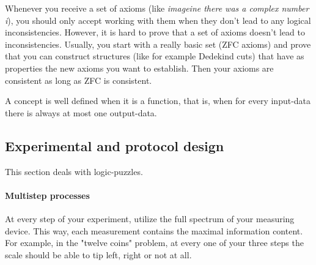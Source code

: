 Whenever you receive a set of axioms (like \emph{imageine there was a complex number i}), you should only accept working with them when they don't lead to any logical inconsistencies. However, it is hard to prove that a set of axioms doesn't lead to inconsistencies. Usually, you start with a really basic set (ZFC axioms) and prove that you can construct structures (like for example Dedekind cuts) that have as properties the new axioms you want to establish. Then your axioms are consistent as long as ZFC is consistent. 

A concept is well defined when it is a function, that is, when for every input-data there is always at most one output-data. 


\subsection{Experimental and protocol design}

This section deals with logic-puzzles. 

\paragraph{Multistep processes}
At every step of your experiment, utilize the full spectrum of your measuring device. This way, each measurement contains the maximal information content. For example, in the "twelve coins" problem, at every one of your three steps the scale should be able to tip left, right or not at all. 
